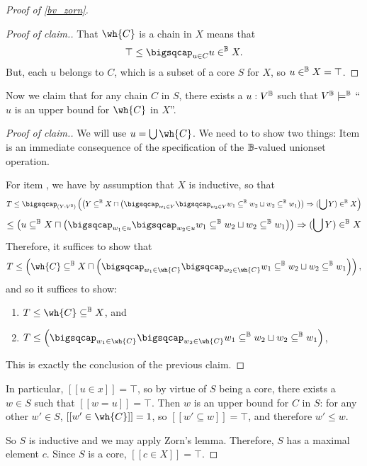 \documentclass[11pt]{article}
\begin{document}
\begin{proof}[Proof of \ref{bv_zorn}]
\begin{proof}[Proof of claim.]
That $\wh{C}$ is a chain in $X$ means that
$$
\top \leq \bigsqcap_{u \in C} u \in^\B X.
$$
But, each $u$ belongs to $C$, which is a subset of a core $S$ for $X$, so $u \in^{\mathbb{B}} X = \top$.
\end{proof}

Now we claim that for any chain $C$ in $S$, there exists a $u : V^{\mathbb{B}}$ such that $V^{\mathbb{B}} \models^{\mathbb{B}}$ ``$u$ is an upper bound for $\wh{C}$ in $X$''.

\begin{proof}[Proof of claim.]
  We will use $u = \bigcup \wh{C}$. We need to to show two things:
  Item  is an immediate consequence of the specification of the $\mathbb{B}$-valued unionset operation.

  For item , we have by assumption that $X$ is inductive, so that
  $$
  T \leq \bigsqcap_{(Y : V^\B)} \left(\left(Y \subseteq^\B X \sqcap \left(\bigsqcap_{w_1 \in Y} \bigsqcap_{w_2 \in Y} w_1 \subseteq^\B w_2 \sqcup w_2 \subseteq^\B w_1\right)\right) \Rightarrow (\bigcup Y) \in^\B X\right)
  $$
  $$
\leq \left(u \subseteq^\B X \sqcap \left(\bigsqcap_{w_1 \in u} \bigsqcap_{w_2 \in u} w_1 \subseteq^\B w_2 \sqcup w_2 \subseteq^\B w_1\right)\right) \Rightarrow (\bigcup Y) \in^\B X
  $$
  Therefore, it suffices to show that
  $$
T \leq \left(\wh{C} \subseteq^\B X \sqcap \left(\bigsqcap_{w_1 \in\wh{C}} \bigsqcap_{w_2 \in\wh{C}} w_1 \subseteq^\B w_2 \sqcup w_2 \subseteq^\B w_1\right)\right),
$$
and so it suffices to show:
\begin{enumerate}
\item $\displaystyle{T \leq\wh{C} \subseteq^\B X}$, and
\item $\displaystyle{T \leq \left(\bigsqcap_{w_1 \in\wh{C}} \bigsqcap_{w_2 \in\wh{C}} w_1 \subseteq^\B w_2 \sqcup w_2 \subseteq^\B w_1\right)}$,
\end{enumerate}

This is exactly the conclusion of the previous claim.
\end{proof}

In particular, $[[u \in x]] = \top$, so by virtue of $S$ being a core, there exists a $w \in S$ such that $[[w = u]] = \top$. Then $w$ is an upper bound for $C$ in $S$: for any other $w' \in S$, $[[w' \in \wh{C}]] = 1$, so $[[w' \subseteq w]] = \top$, and therefore $w' \leq w$.

So $S$ is inductive and we may apply Zorn's lemma. Therefore, $S$ has a maximal element $c$. Since $S$ is a core, $[[c \in X]] = \top$.


\end{proof}
\end{document}
